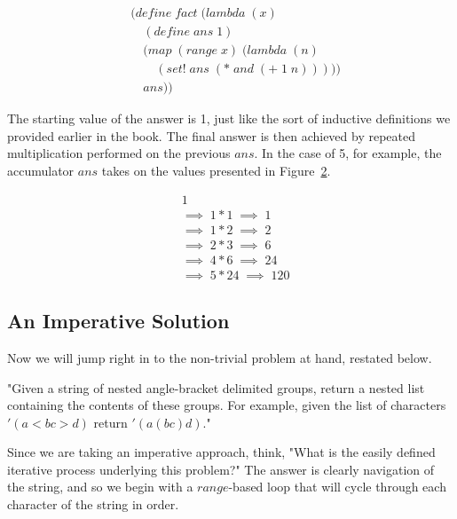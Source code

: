 \begin{figure}[htp]
\footnotesize
\caption{}\label{fig:imperFactExample}
\begin{align*}
& (define \; fact \; (lambda \; (x)
\\& \quad (define \; ans \; 1)
\\& \quad (map \; (range \; x) \; (lambda \; (n)
\\& \qquad (set! \; ans \; (* \; and \; (+ \; 1 \; n)))))
\\& \quad ans))
\end{align*}
\end{figure}

The starting value of the answer is 1, just like the sort of inductive definitions we 
provided earlier in the book. The final answer is then achieved by repeated 
multiplication performed on the previous $ans$. In the case of 5, for example, the 
accumulator $ans$ takes on the values presented in Figure~\ref{fig:ansValues}.

\begin{figure}[htp]
\footnotesize
\caption{}\label{fig:ansValues}
\begin{align*}
& 1
\\& \implies \; 1*1 \; \implies \; 1
\\& \implies \; 1*2 \; \implies \; 2
\\& \implies \; 2*3 \; \implies \; 6
\\& \implies \; 4*6 \; \implies \; 24
\\& \implies \; 5*24 \; \implies \; 120
\end{align*}
\end{figure}

\subsection{An Imperative Solution}
Now we will jump right in to the non-trivial problem at hand, restated below.

"Given a string of nested angle-bracket delimited groups, return a
nested list containing the contents of these groups. For example,
given the list of characters $'(a < b c > d)$ return $'(a (b c) d)$."

Since we are taking an imperative approach, think, "What is the easily defined iterative 
process underlying this problem?" The answer is clearly navigation of the string, and so 
we begin with a $range$-based loop that will cycle through each character of the string 
in order.

